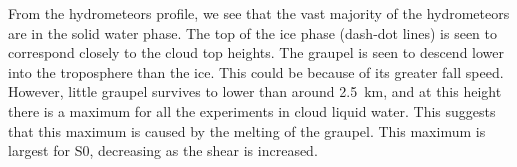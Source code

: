 \documentclass[11pt,a4paper]{article}
\newcommand\todo[1]{\textbf{TODO: #1}}
\begin{document}
From the hydrometeors profile, we see that the vast majority of the hydrometeors are in the solid water phase. The top of the ice phase (dash-dot lines) is seen to correspond closely to the cloud top heights. The graupel is seen to descend lower into the troposphere than the ice. This could be because of its greater fall speed. However, little graupel survives to lower than around \SI{2.5}{km}, and at this height there is a maximum for all the experiments in cloud liquid water. This suggests that this maximum is caused by the melting of the graupel. This maximum is largest for S0, decreasing as the shear is increased. 


\end{document}
